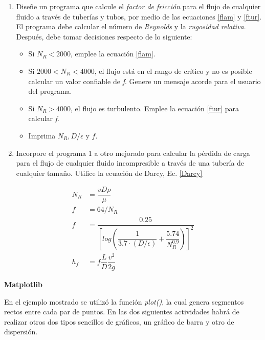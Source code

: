 \documentclass[12pt, oneside, a4paper, spanish]{article}
\begin{document}
\begin{enumerate}
	\item Diseñe un programa que calcule el \emph{factor de fricción} para el flujo de cualquier fluido a través de tuberías y tubos, por medio de las ecuaciones \eqref{flam} y \eqref{ftur}. El programa debe calcular el número de \emph{Reynolds} y la \emph{rugosidad relativa}. Después, debe tomar decisiones respecto de lo siguiente:
	
	\begin{itemize}
		\item Si $N_{R} < 2000$, emplee la ecuación \eqref{flam}.
		\item Si $2000 < N_{R} < 4000$, el flujo está en el rango de crítico y no es posible calcular un valor confiable de \emph{f}. Genere un mensaje acorde para el usuario del programa.
		\item Si $N_{R} > 4000$, el flujo es turbulento. Emplee la ecuación \eqref{ftur} para calcular \emph{f}.
		\item Imprima $N_{R}, D/\epsilon$ y $f$.
	\end{itemize}
	
	\item Incorpore el programa 1 a otro mejorado para calcular la pérdida de carga para el flujo de cualquier fluido incompresible a través de una tubería de cualquier tamaño. Utilice la ecuación de Darcy, Ec. \eqref{Darcy}  
\end{enumerate}

\begin{tcolorbox}[colback=black!5!white,colframe=white!50!black,title=Ecuaciones a utilizar]
	\begin{align}
	N_R &= \dfrac{vD\rho}{\mu}\\[1em]
	f &= 64/N_{R}\label{flam}\\[1em]
	f &= \dfrac{0.25}{
		\left[log\left(\dfrac{1}{3.7 \cdot (D/\epsilon)}+
		\dfrac{5.74}{N^{0.9}_{R}}\right)\right]^{2}}\label{ftur}\\[1em]
	h_f &= f \dfrac{L}{D} \dfrac{v^2}{2g}\label{Darcy}
	\end{align}
\end{tcolorbox}

\textbf{Matplotlib}

En el ejemplo mostrado se utilizó la función \emph{plot()}, la cual genera segmentos rectos entre cada par de puntos. En las dos siguientes actividades habrá de realizar otros dos tipos sencillos de gráficos, un gráfico de barra y otro de dispersión.
\end{document}
